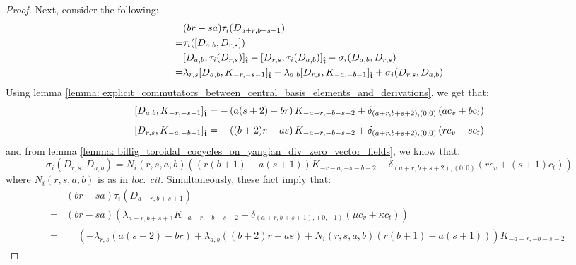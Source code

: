 \begin{proof}
                Next, consider the following:
                    $$
                        \begin{aligned}
                            & (br - sa) \tau_i(D_{a + r, b + s + 1})
                            \\
                            = & \tau_i( [D_{a, b}, D_{r, s}] )
                            \\
                            = & [D_{a, b}, \tau_i(D_{r, s})]_{\hat{\mathfrak{t}}} - [D_{r, s}, \tau_i(D_{a, b})]_{\hat{\mathfrak{t}}} - \sigma_i(D_{a, b}, D_{r, s})
                            \\
                            = & \lambda_{r, s} [D_{a, b}, K_{-r, -s - 1}]_{\hat{\mathfrak{t}}} - \lambda_{a, b} [D_{r, s}, K_{-a, -b - 1}]_{\hat{\mathfrak{t}}} + \sigma_i(D_{r, s}, D_{a, b})
                        \end{aligned}
                    $$
                Using lemma \ref{lemma: explicit_commutators_between_central_basis_elements_and_derivations}, we get that:
                    $$[D_{a, b}, K_{-r, -s - 1}]_{\hat{\mathfrak{t}}} = -\left( a(s + 2) - br \right) K_{-a - r, -b - s - 2} + \delta_{(a + r, b + s + 2), (0, 0)} \left( a c_v + b c_t \right)$$
                    $$[D_{r, s}, K_{-a, -b - 1}]_{\hat{\mathfrak{t}}} = -\left( (b + 2) r - as \right) K_{-a - r, -b - s - 2} + \delta_{(a + r, b + s + 2), (0, 0)} \left( r c_v + s c_t \right)$$
                and from lemma \ref{lemma: billig_toroidal_cocycles_on_yangian_div_zero_vector_fields}, we know that:
                    $$\sigma_i(D_{r, s}, D_{a, b}) = N_i(r, s, a, b) \left( ( r(b + 1) - a(s + 1) )K_{-r - a, -s - b - 2} - \delta_{ (a + r, b + s + 2), (0, 0) } (r c_v + (s + 1) c_t) \right)$$
                where $N_i(r, s, a, b)$ is as in \textit{loc. cit.} Simultaneously, these fact imply that:
                    \begin{equation} \label{equation: coboundary_equation_D_rs_D_ab}
                        \begin{aligned}
                            & (br - sa) \tau_i(D_{a + r, b + s + 1})
                            \\
                            = & (br - sa) \left( \lambda_{a + r, b + s + 1} K_{-a - r, -b - s - 2} + \delta_{(a + r, b + s + 1), (0, -1)}( \mu c_v + \kappa c_t ) \right)
                            \\
                            = &
                            \begin{aligned}
                                & \left( -\lambda_{r, s} \left( a(s + 2) - br \right) + \lambda_{a, b} \left( (b + 2) r - as \right) + N_i(r, s, a, b)\left( r(b + 1) - a(s + 1) \right) \right) K_{-a - r, -b - s - 2}

\end{aligned}
\end{aligned}
\end{equation}
\end{proof}
